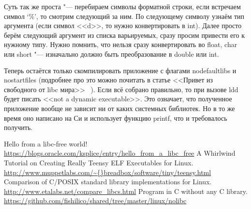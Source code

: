 \documentclass[10pt, a5paper]{article}
\begin{document}
Суть так же проста "--- перебираем символы форматной строки, если встречаем символ `\%', то смотрим следующий за ним. По следующему символу узнаём тип аргумента (если символ <<d>>, то нужно конвертировать в int). Далее просто берём следующий аргумент из списка варьируемых, сразу просим привести его к нужному типу. Нужно помнить, что нельзя сразу конвертировать во float, char или short "--- изначально должно быть преобразование в double или int.

Теперь остаётся только скомпилировать приложение с флагами nodefaultlibs и nostartfiles (подробнее про это можно почитать в статье <<Привет из свободного от libc мира>> ~\cite{Khrabrov1}). Если всё собрано правильно, то при вызове ldd будет писать <<not a dynamic executable>>. Это означает, что полученное приложение вообще не зависит ни от каких системных библиотек. Но в то же время оно написано на Си и использует функцию printf, что и требовалось получить.

\begin{thebibliography}{99}

 Hello from a libc-free world! \url{https://blogs.oracle.com/ksplice/entry/hello\_from\_a\_libc\_free}
 A Whirlwind Tutorial on Creating Really Teensy ELF Executables for Linux. \url{http://www.muppetlabs.com/\~{}breadbox/software/tiny/teensy.html}
 Comparison of C/POSIX standard library implementations for Linux. \url{http://www.etalabs.net/compare\_libcs.html}
 Program in C without any C library. \url{https://github.com/fishilico/shared/tree/master/linux/nolibc}
\end{thebibliography}
\end{document}
